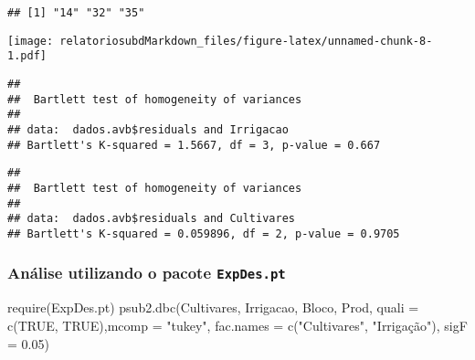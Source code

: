 \documentclass[
]{article}
\newenvironment{Shaded}{\begin{snugshade}}{\end{snugshade}}
\newcommand{\AttributeTok}[1]{\textcolor[rgb]{0.77,0.63,0.00}{#1}}
\newcommand{\ConstantTok}[1]{\textcolor[rgb]{0.00,0.00,0.00}{#1}}
\newcommand{\FloatTok}[1]{\textcolor[rgb]{0.00,0.00,0.81}{#1}}
\newcommand{\FunctionTok}[1]{\textcolor[rgb]{0.00,0.00,0.00}{#1}}
\newcommand{\NormalTok}[1]{#1}
\newcommand{\StringTok}[1]{\textcolor[rgb]{0.31,0.60,0.02}{#1}}
\begin{document}
\begin{verbatim}
## [1] "14" "32" "35"
\end{verbatim}

\texttt{[image: relatoriosubdMarkdown\_files/figure-latex/unnamed-chunk-8-1.pdf]}

\begin{verbatim}
## 
##  Bartlett test of homogeneity of variances
## 
## data:  dados.avb$residuals and Irrigacao
## Bartlett's K-squared = 1.5667, df = 3, p-value = 0.667
\end{verbatim}

\begin{verbatim}
## 
##  Bartlett test of homogeneity of variances
## 
## data:  dados.avb$residuals and Cultivares
## Bartlett's K-squared = 0.059896, df = 2, p-value = 0.9705
\end{verbatim}

\hypertarget{anuxe1lise-utilizando-o-pacote-expdes.pt}{%
\subsubsection{\texorpdfstring{Análise utilizando o pacote
\texttt{ExpDes.pt}}{Análise utilizando o pacote ExpDes.pt}}\label{anuxe1lise-utilizando-o-pacote-expdes.pt}}

\begin{Shaded}
\begin{Highlighting}[]
\FunctionTok{require}\NormalTok{(ExpDes.pt)}
\FunctionTok{psub2.dbc}\NormalTok{(Cultivares, Irrigacao, Bloco, Prod, }\AttributeTok{quali =} \FunctionTok{c}\NormalTok{(}\ConstantTok{TRUE}\NormalTok{, }\ConstantTok{TRUE}\NormalTok{),}\AttributeTok{mcomp =} \StringTok{"tukey"}\NormalTok{,}
          \AttributeTok{fac.names =} \FunctionTok{c}\NormalTok{(}\StringTok{"Cultivares"}\NormalTok{, }\StringTok{"Irrigação"}\NormalTok{), }\AttributeTok{sigF =} \FloatTok{0.05}\NormalTok{)}
\end{Highlighting}
\end{Shaded}
\end{document}
